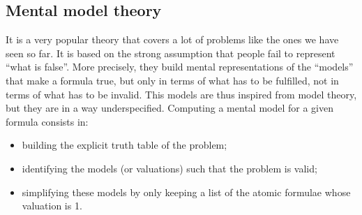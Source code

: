 \documentclass[french]{article}
\begin{document}
\subsection{Mental model theory}
It is a very popular theory that covers a lot of problems like the ones we have seen so far. It is based on the strong assumption that people fail to represent ``what is false''. More precisely, they build mental representations of the ``models'' that make a formula true, but only in terms of what has to be fulfilled, not in terms of what has to be invalid. This models are thus inspired from model theory, but they are in a way underspecified. Computing a mental model for a given formula consists in:
\begin{itemize}
	\item building the explicit truth table of the problem;
	\item identifying the models (or valuations) such that the problem is valid;
	\item simplifying these models by only keeping a list of the atomic formulae whose valuation is 1.
\end{itemize}
\end{document}
